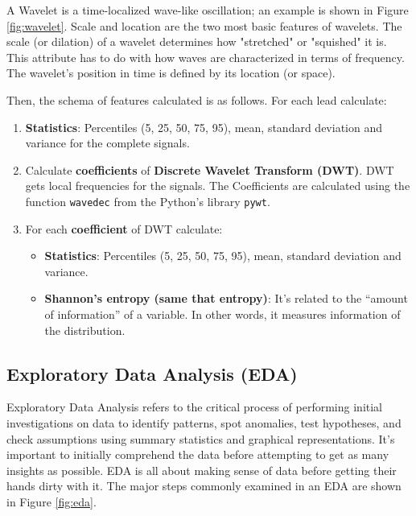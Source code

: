 A Wavelet is a time-localized wave-like oscillation; an example is shown in Figure \ref{fig:wavelet}. Scale and location are the two most basic features of wavelets. The scale (or dilation) of a wavelet determines how "stretched" or "squished" it is. This attribute has to do with how waves are characterized in terms of frequency. The wavelet's position in time is defined by its location (or space).

Then, the schema of features calculated is as follows. For each lead calculate:

\begin{enumerate}
    \item \textbf{Statistics}: Percentiles (5, 25, 50, 75, 95), mean, standard deviation and variance for the complete signals.
    
    \item Calculate \textbf{coefficients} of \textbf{Discrete Wavelet Transform (DWT)}. DWT gets local frequencies for the signals. The Coefficients are calculated using the function \texttt{wavedec} from the Python’s library \texttt{pywt}.
    
    \item For each \textbf{coefficient} of DWT calculate:
    \begin{itemize}
        \item \textbf{Statistics}: Percentiles (5, 25, 50, 75, 95), mean, standard deviation and variance.
        
        \item \textbf{Shannon’s entropy (same that entropy)}: It’s related to the “amount of information” of a variable. In other words, it measures information of the distribution.
    \end{itemize}
\end{enumerate}


\subsection{Exploratory Data Analysis (EDA)} \label{4eda}

Exploratory Data Analysis refers to the critical process of performing initial investigations on data to identify patterns, spot anomalies, test hypotheses, and check assumptions using summary statistics and graphical representations. It's important to initially comprehend the data before attempting to get as many insights as possible. EDA is all about making sense of data before getting their hands dirty with it. The major steps commonly examined in an EDA are shown in Figure \ref{fig:eda}.

